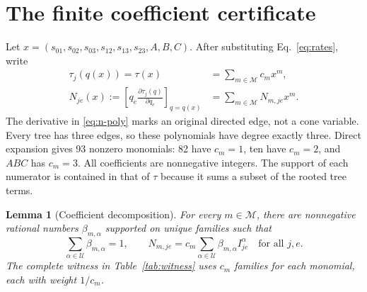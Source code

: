 \documentclass[11pt,a4paper]{article}
\newtheorem{lemma}{Lemma}
\newcommand{\U}{\mathcal U}
\begin{document}
\section{The finite coefficient certificate}
\label{sec:certificate}

Let $x=(s_{01},s_{02},s_{03},s_{12},s_{13},s_{23},A,B,C)$.
After substituting Eq.~\eqref{eq:rates}, write
\begin{align}
 \tau_j(q(x))=\tau(x)&=\sum_{m\in\mathcal M}c_m x^m,
 \label{eq:tau-poly}\\
 N_{je}(x):=\left[q_e\frac{\partial\tau_j(q)}{\partial q_e}
                  \right]_{q=q(x)}
 &=\sum_{m\in\mathcal M}N_{m,je}x^m.
 \label{eq:n-poly}
\end{align}
The derivative in \eqref{eq:n-poly} marks an original directed edge,
not a cone variable. Every tree has three edges, so these polynomials
have degree exactly three. Direct expansion gives 93 nonzero monomials:
82 have $c_m=1$, ten have $c_m=2$, and $ABC$ has $c_m=3$.
All coefficients are nonnegative integers. The support of each numerator
is contained in that of $\tau$ because it sums a subset of the rooted
tree terms.

\begin{lemma}[Coefficient decomposition]
\label{lem:coeff}
For every $m\in\mathcal M$, there are nonnegative rational numbers
$\beta_{m,\alpha}$ supported on unique families such that
\begin{equation}
 \sum_{\alpha\in\U}\beta_{m,\alpha}=1,\qquad
 N_{m,je}=c_m\sum_{\alpha\in\U}\beta_{m,\alpha}I^\alpha_{je}
 \quad\text{for all }j,e.
 \label{eq:coeff}
\end{equation}
The complete witness in Table~\ref{tab:witness} uses $c_m$ families
for each monomial, each with weight $1/c_m$.
\end{lemma}
\end{document}

